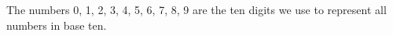 The numbers 0, 1, 2, 3, 4, 5, 6, 7, 8, 9 are the ten digits we use to represent
all numbers in base ten.
